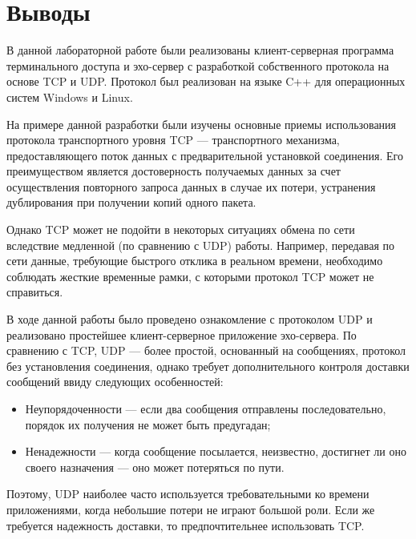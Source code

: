 \section{Выводы}

В данной лабораторной работе были реализованы клиент-серверная программа терминального доступа и эхо-сервер с разработкой собственного протокола на основе TCP и UDP. Протокол был реализован на языке C++ для операционных систем Windows и Linux.

На примере данной разработки были изучены основные приемы использования протокола транспортного уровня TCP --- транспортного механизма, предоставляющего поток данных с предварительной установкой соединения. Его преимуществом является достоверность получаемых данных за счет осуществления повторного запроса данных в случае их потери, устранения дублирования при получении копий одного пакета.

Однако TCP может не подойти в некоторых ситуациях обмена по сети вследствие медленной (по сравнению с UDP) работы. Например, передавая по сети данные, требующие быстрого отклика в реальном времени, необходимо соблюдать жесткие временные рамки, с которыми протокол TCP может не справиться.

В ходе данной работы было проведено ознакомление с протоколом UDP и реализовано простейшее клиент-серверное приложение эхо-сервера. По сравнению с TCP, UDP --- более простой, основанный на сообщениях, протокол без установления соединения, однако требует дополнительного контроля доставки сообщений ввиду следующих особенностей:

\begin{itemize}
	\item Неупорядоченности --- если два сообщения отправлены последовательно, порядок их получения не может быть предугадан;
	\item Ненадежности --- когда сообщение посылается, неизвестно, достигнет ли оно своего назначения --- оно может потеряться по пути.
\end{itemize}

Поэтому, UDP наиболее часто используется требовательными ко времени приложениями, когда небольшие потери не играют большой роли. Если же требуется надежность доставки, то предпочтительнее использовать TCP.